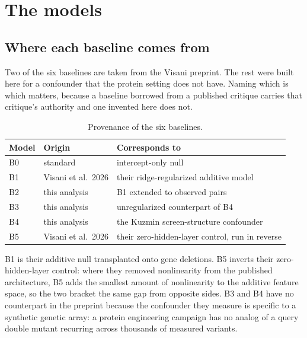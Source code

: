 
\section{The models}
\label{sec:models}

\subsection{Where each baseline comes from}
\label{sec:provenance}

Two of the six baselines are taken from the Visani preprint. The rest were built
here for a confounder that the protein setting does not have. Naming which is which
matters, because a baseline borrowed from a published critique carries that
critique's authority and one invented here does not.

\begin{table}[htbp]
\centering
\footnotesize
\caption{Provenance of the six baselines.}
\label{tab:modelorigin}
\begin{tabular}{lll}
\toprule
Model & Origin & Corresponds to \\
\midrule
B0 & standard & intercept-only null \\
B1 & Visani et al.\ 2026 & their ridge-regularized additive model \\
B2 & this analysis & B1 extended to observed pairs \\
B3 & this analysis & unregularized counterpart of B4 \\
B4 & this analysis & the Kuzmin screen-structure confounder \\
B5 & Visani et al.\ 2026 & their zero-hidden-layer control, run in reverse \\
\bottomrule
\end{tabular}
\end{table}

B1 is their additive null transplanted onto gene deletions. B5 inverts their
zero-hidden-layer control: where they removed nonlinearity from the published
architecture, B5 adds the smallest amount of nonlinearity to the additive feature
space, so the two bracket the same gap from opposite sides. B3 and B4 have no
counterpart in the preprint because the confounder they measure is specific to a
synthetic genetic array: a protein engineering campaign has no analog of a query
double mutant recurring across thousands of measured variants.

